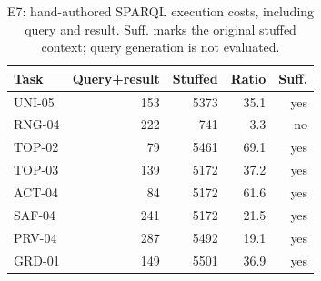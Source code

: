 \begin{table}[t]
\centering\footnotesize
\caption{E7: hand-authored SPARQL execution costs, including query and result. Suff. marks the original stuffed context; query generation is not evaluated.}
\label{tab:archive-queries}
\setlength{\tabcolsep}{3.5pt}
\begin{tabular}{@{}lrrrr@{}}
\toprule
Task & Query+result & Stuffed & Ratio & Suff. \\
\midrule
UNI-05 & 153 & 5373 & 35.1 & yes \\
RNG-04 & 222 & 741 & 3.3 & no \\
TOP-02 & 79 & 5461 & 69.1 & yes \\
TOP-03 & 139 & 5172 & 37.2 & yes \\
ACT-04 & 84 & 5172 & 61.6 & yes \\
SAF-04 & 241 & 5172 & 21.5 & yes \\
PRV-04 & 287 & 5492 & 19.1 & yes \\
GRD-01 & 149 & 5501 & 36.9 & yes \\
\bottomrule
\end{tabular}
\end{table}
